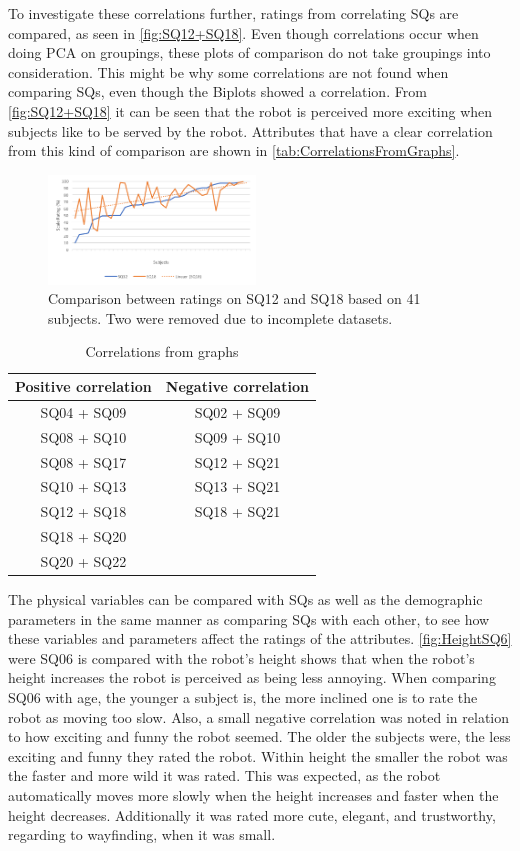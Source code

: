\noindent
%
To investigate these correlations further, ratings from correlating SQs are compared, as seen in \autoref{fig:SQ12+SQ18}. Even though correlations occur when doing PCA on groupings, these plots of comparison do not take groupings into consideration. This might be why some correlations are not found when comparing SQs, even though the Biplots showed a correlation. From \autoref{fig:SQ12+SQ18} it can be seen that the robot is perceived more exciting when subjects like to be served by the robot. Attributes that have a clear correlation from this kind of comparison are shown in \autoref{tab:CorrelationsFromGraphs}.
%
\begin{figure}[H]
	\centering
	\includegraphics[width = 0.49\textwidth]{Figure/SQ12+SQ18}
	\setlength{} 
	\caption{Comparison between ratings on SQ12 and SQ18 based on 41 subjects. Two were removed due to incomplete datasets.}
	\label{fig:SQ12+SQ18}
\end{figure}
\noindent
%
\begin{table}
	\centering
	\caption{Correlations from graphs}
	\label{tab:CorrelationsFromGraphs} 
	\begin{tabular}{ c|c }
		\centering
		Positive correlation & Negative correlation \\ \hline
		SQ04 + SQ09 & SQ02 + SQ09 \\ 
		SQ08 + SQ10 & SQ09 + SQ10 \\ 
		SQ08 + SQ17 & SQ12 + SQ21 \\ 
		SQ10 + SQ13 & SQ13 + SQ21 \\ 
		SQ12 + SQ18 & SQ18 + SQ21	\\	
		SQ18 + SQ20 & 			\\
		SQ20 + SQ22 & 
	\end{tabular}        
\end{table}
\noindent
%
The physical variables can be compared with SQs as well as the demographic parameters in the same manner as comparing SQs with each other, to see how these variables and parameters affect the ratings of the attributes. \autoref{fig:HeightSQ6} were SQ06 is compared with the robot's height shows that when the robot's height increases the robot is perceived as being less annoying. When comparing SQ06 with age, the younger a subject is, the more inclined one is to rate the robot as moving too slow. Also, a small negative correlation was noted in relation to how exciting and funny the robot seemed. The older the subjects were, the less exciting and funny they rated the robot. Within height the smaller the robot was the faster and more wild it was rated. This was expected, as the robot automatically moves more slowly when the height increases and faster when the height decreases. Additionally it was rated more cute, elegant, and trustworthy, regarding to wayfinding, when it was small.
